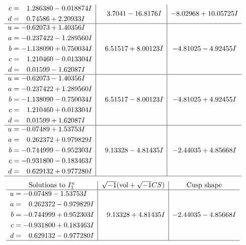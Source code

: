 \documentclass[1p]{elsarticle_modified}
\theoremstyle{definition}
\newcommand{\I}{\sqrt{-1}}
\begin{document}
$$\begin{array}{c|c|c}
\begin{aligned}
c &= \phantom{-}1.286380 - 0.018874 I \\
d &= \phantom{-}0.74586 + 2.20933 I\end{aligned}
 & \phantom{-}3.7041 - 16.8176 I & -8.02968 + 10.05725 I \\ \hline\begin{aligned}
u &= -0.62073 + 1.40356 I \\
a &= -0.237422 - 1.289560 I \\
b &= -1.138090 + 0.750034 I \\
c &= \phantom{-}1.210460 - 0.013304 I \\
d &= \phantom{-}0.01599 - 1.62087 I\end{aligned}
 & \phantom{-}6.51517 + 8.00123 I & -4.81025 - 4.92455 I \\ \hline\begin{aligned}
u &= -0.62073 - 1.40356 I \\
a &= -0.237422 + 1.289560 I \\
b &= -1.138090 - 0.750034 I \\
c &= \phantom{-}1.210460 + 0.013304 I \\
d &= \phantom{-}0.01599 + 1.62087 I\end{aligned}
 & \phantom{-}6.51517 - 8.00123 I & -4.81025 + 4.92455 I \\ \hline\begin{aligned}
u &= -0.07489 + 1.53753 I \\
a &= \phantom{-}0.262372 + 0.979829 I \\
b &= -0.744999 - 0.952303 I \\
c &= -0.931800 - 0.183463 I \\
d &= \phantom{-}0.629132 + 0.977280 I\end{aligned}
 & \phantom{-}9.13328 - 4.81435 I & -2.44035 + 4.85668 I\\
 \hline 
 \end{array}$$\newpage$$\begin{array}{c|c|c}  
\text{Solutions to }I^u_{1}& \I (\text{vol} + \sqrt{-1}CS) & \text{Cusp shape}\\
 \hline 
\begin{aligned}
u &= -0.07489 - 1.53753 I \\
a &= \phantom{-}0.262372 - 0.979829 I \\
b &= -0.744999 + 0.952303 I \\
c &= -0.931800 + 0.183463 I \\
d &= \phantom{-}0.629132 - 0.977280 I\end{aligned}
 & \phantom{-}9.13328 + 4.81435 I & -2.44035 - 4.85668 I\\
 \hline 
 \end{array}$$\newpage\newpage\renewcommand{\arraystretch}{1}
\end{document}

